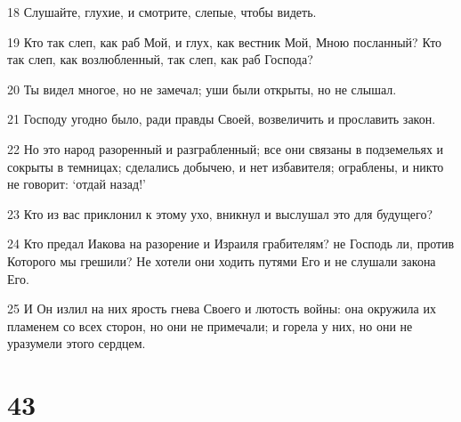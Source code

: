 \par 18 Слушайте, глухие, и смотрите, слепые, чтобы видеть.
\par 19 Кто так слеп, как раб Мой, и глух, как вестник Мой, Мною посланный? Кто так слеп, как возлюбленный, так слеп, как раб Господа?
\par 20 Ты видел многое, но не замечал; уши были открыты, но не слышал.
\par 21 Господу угодно было, ради правды Своей, возвеличить и прославить закон.
\par 22 Но это народ разоренный и разграбленный; все они связаны в подземельях и сокрыты в темницах; сделались добычею, и нет избавителя; ограблены, и никто не говорит: `отдай назад!'
\par 23 Кто из вас приклонил к этому ухо, вникнул и выслушал это для будущего?
\par 24 Кто предал Иакова на разорение и Израиля грабителям? не Господь ли, против Которого мы грешили? Не хотели они ходить путями Его и не слушали закона Его.
\par 25 И Он излил на них ярость гнева Своего и лютость войны: она окружила их пламенем со всех сторон, но они не примечали; и горела у них, но они не уразумели этого сердцем.

\chapter{43}


